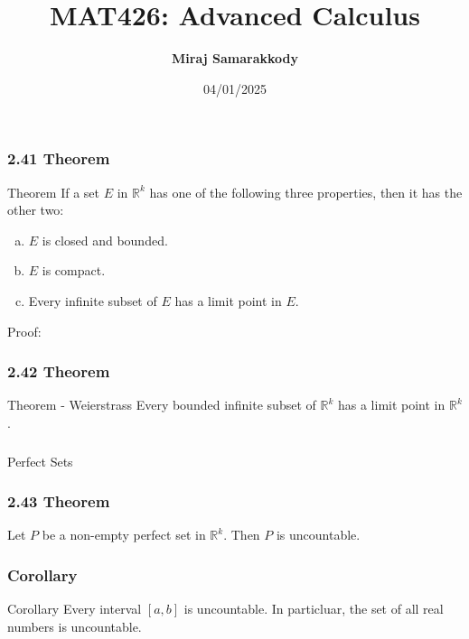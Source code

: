 \documentclass{beamer}
\title{MAT426: Advanced Calculus}
\author{\textbf{Miraj Samarakkody}}
\institute{Tougaloo College}
\date{04/01/2025}
\begin{document}
\begin{frame}
    \titlepage
\end{frame}





\begin{frame}
    \frametitle{2.41 Theorem}

    \begin{block}{Theorem}
        If a set \(E\) in \(\mathbb{R}^k\) has one of the following three properties, then it has the other two: 
        \begin{enumerate}[(a)]
            \item \(E\) is closed and bounded.
            \item \(E\) is compact. 
            \item Every infinite subset of \(E\) has a limit point in \(E\).
        \end{enumerate}
    \end{block}
    \begin{block}{Proof:}
        
    \end{block}

\end{frame}

\begin{frame}
    \frametitle{2.42 Theorem}

    \begin{block}{Theorem - Weierstrass}
        Every bounded infinite subset of \(\mathbb{R}^k\) has a limit point in \(\mathbb{R}^k\).
    \end{block}

\end{frame}

\begin{frame}
    \frametitle{}

        \Huge{Perfect Sets}

\end{frame}

\begin{frame}
    \frametitle{2.43 Theorem}

    Let \(P\) be a non-empty perfect set in \(\mathbb{R}^k\). Then \(P\) is uncountable. 

\end{frame}

\begin{frame}
    \frametitle{Corollary}

    \begin{block}{Corollary}
        Every interval \([a,b]\) is uncountable. In particluar, the set of all real numbers is uncountable. 
    \end{block}

\end{frame}
\end{document}
